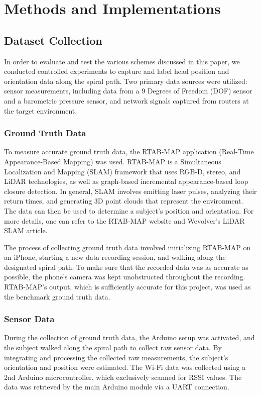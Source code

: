 \chapter{Methods and Implementations}

\section{Dataset Collection}
In order to evaluate and test the various schemes discussed in this paper, we conducted controlled experiments to capture and label head position and orientation data along the spiral path. Two primary data sources were utilized: sensor measurements, including data from a 9 Degrees of Freedom (DOF) sensor and a barometric pressure sensor, and network signals captured from routers at the target environment.

\subsection{Ground Truth Data}
To measure accurate ground truth data, the RTAB-MAP application (Real-Time Appearance-Based Mapping) was used. RTAB-MAP is a Simultaneous Localization and Mapping (SLAM) framework that uses RGB-D, stereo, and LiDAR technologies, as well as graph-based incremental appearance-based loop closure detection. In general, SLAM involves emitting laser pulses, analyzing their return times, and generating 3D point clouds that represent the environment. The data can then be used to determine a subject's position and orientation. For more details, one can refer to the RTAB-MAP website \cite{rtabmap} and Wevolver's LiDAR SLAM article. \cite{malik_2023_lidar}
\par
The process of collecting ground truth data involved initializing RTAB-MAP on an iPhone, starting a new data recording session, and walking along the designated spiral path. To make sure that the recorded data was as accurate as possible, the phone's camera was kept unobstructed throughout the recording. RTAB-MAP's output, which is sufficiently accurate for this project, was used as the benchmark ground truth data.

\subsection{Sensor Data}
During the collection of ground truth data, the Arduino setup was activated, and the subject walked along the spiral path to collect raw sensor data. By integrating and processing the collected raw measurements, the subject's orientation and position were estimated. The Wi-Fi data was collected using a 2nd Arduino microcontroller, which exclusively scanned for RSSI values. The data was retrieved by the main Arduino module via a UART connection.

